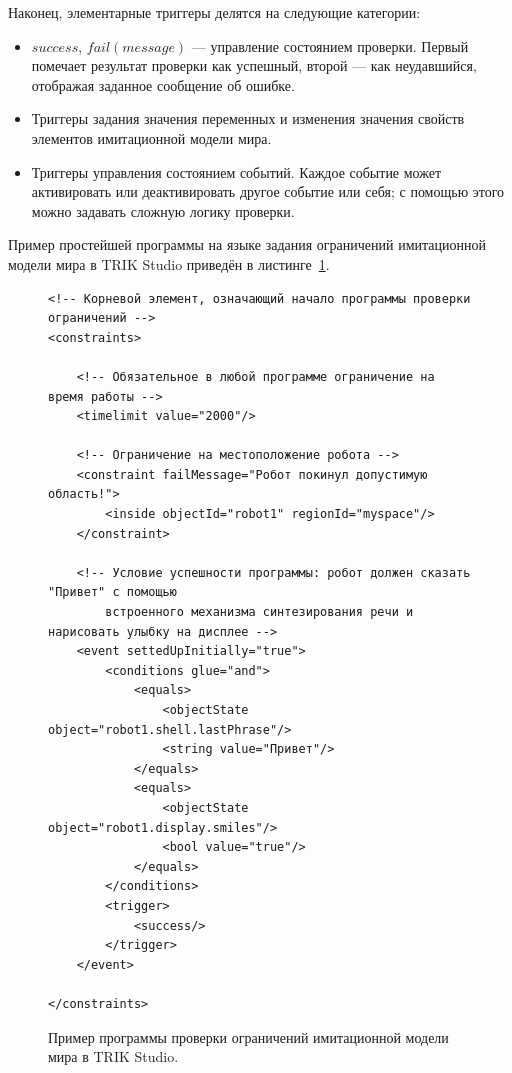 \documentclass[conference]{IEEEtran}
\begin{document}
Наконец, элементарные триггеры делятся на следующие категории:
\begin{itemize}
    \item $success$, $fail(message)$ --- управление состоянием проверки. Первый помечает результат проверки как успешный, второй --- как неудавшийся, отображая заданное сообщение об ошибке.
    \item Триггеры задания значения переменных и изменения значения свойств элементов имитационной модели мира.
    \item Триггеры управления состоянием событий. Каждое событие может активировать или деактивировать другое событие или себя; с помощью этого можно задавать сложную логику проверки.
\end{itemize}

Пример простейшей программы на языке задания ограничений имитационной модели мира в TRIK Studio приведён в листинге~\ref{code:constraints}.

\captionsetup[figure]{name=Листинг}
\setcounter{figure}{0}

\begin{figure}[!t]
\begin{verbatim}
<!-- Корневой элемент, означающий начало программы проверки ограничений -->
<constraints>

    <!-- Обязательное в любой программе ограничение на время работы -->
    <timelimit value="2000"/>

    <!-- Ограничение на местоположение робота -->
    <constraint failMessage="Робот покинул допустимую область!">
        <inside objectId="robot1" regionId="myspace"/>
    </constraint>

    <!-- Условие успешности программы: робот должен сказать "Привет" с помощью
        встроенного механизма синтезирования речи и нарисовать улыбку на дисплее -->
    <event settedUpInitially="true">
        <conditions glue="and">
            <equals>
                <objectState object="robot1.shell.lastPhrase"/>
                <string value="Привет"/>
            </equals>
            <equals>
                <objectState object="robot1.display.smiles"/>
                <bool value="true"/>
            </equals>
        </conditions>
        <trigger>
            <success/>
        </trigger>
    </event>

</constraints>
\end{verbatim}
\caption{Пример программы проверки ограничений имитационной модели мира в TRIK Studio.}
\label{code:constraints}
\end{figure}
\end{document}
